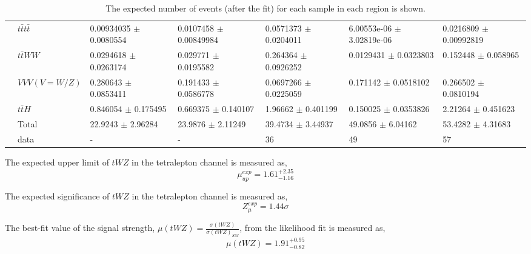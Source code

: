 \begin{table}[h!]
{\begin{tabular}{|l|l|l|l|l|l|l|}
                        & $t\bar{t}t\bar{t}$          & 0.00934035 $\pm$ 0.0080554    & 0.0107458 $\pm$ 0.00849984  & 0.0571373 $\pm$ 0.0204011     & 6.00553e-06 $\pm$ 3.02819e-06 & 0.0216809 $\pm$ 0.00992819 \\
                        & $t\bar{t}WW$          & 0.0294618 $\pm$ 0.0263174     & 0.029771 $\pm$ 0.0195582    & 0.264364 $\pm$ 0.0926252      & 0.0129431 $\pm$ 0.0323803     & 0.152448 $\pm$ 0.058965    \\
                        & $VVV (V = W/Z)$          & 0.280643 $\pm$ 0.0853411      & 0.191433 $\pm$ 0.0586778    & 0.0697266 $\pm$ 0.0225059     & 0.171142 $\pm$ 0.0518102      & 0.266502 $\pm$ 0.0810194   \\
                        & $t\bar{t}H$           & 0.846054 $\pm$ 0.175495       & 0.669375 $\pm$ 0.140107     & 1.96662 $\pm$ 0.401199        & 0.150025 $\pm$ 0.0353826      & 2.21264 $\pm$ 0.451623     \\\hline
                        & Total         & 22.9243 $\pm$ 2.96284         & 23.9876 $\pm$ 2.11249       & 39.4734 $\pm$ 3.44937         & 49.0856 $\pm$ 6.04162         & 53.4282 $\pm$ 4.31683      \\ \hline
                        & data          & -                                         & -                                      & 36                                         & 49                                         & 57                                      \\ \hline
\end{tabular}}
\caption{The expected number of events (after the fit) for each sample in each region is shown.}
\label{tab:4Lep-PostFit-Yields}
\end{table}

The expected upper limit of $tWZ$ in the tetralepton channel is measured as,
\begin{equation}
  \mu_{up}^{exp} =   1.61^{+2.35}_{-1.16}
\end{equation}

The expected significance of $tWZ$ in the tetralepton channel is measured as,
\begin{equation}
 Z_{\mu}^{exp} =   1.44\sigma
\end{equation}

The best-fit value of the signal strength, $\mu (tWZ)= \frac{\sigma(tWZ)}{\sigma(tWZ)_{SM}}$, from the likelihood fit is measured as,
\begin{equation}
  \mu (tWZ) =   1.91^{+0.95}_{-0.82}
\end{equation}

